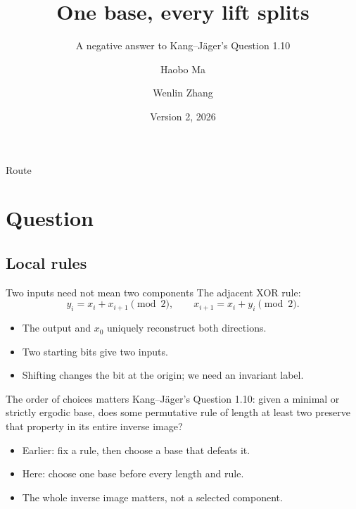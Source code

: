 \documentclass{beamer}
\title{One base, every lift splits}
\subtitle{A negative answer to Kang--Jäger's Question 1.10}
\author{Haobo Ma\inst{1} \and Wenlin Zhang\inst{1,2}}
\institute{\inst{1}Chrono AI, Singapore\and\inst{2}National University of Singapore, Singapore}
\date{Version 2, 2026}
\begin{document}
\begin{frame}
\titlepage
{}
\end{frame}

\begin{frame}{Route}
\tableofcontents
{}
\end{frame}

\section{Question}
\subsection{Local rules}

\begin{frame}{Two inputs need not mean two components}
The adjacent XOR rule:
\[
y_i=x_i+x_{i+1}\pmod 2,\qquad x_{i+1}=x_i+y_i\pmod 2.
\]
\begin{itemize}
\item The output and $x_0$ uniquely reconstruct both directions.
\item Two starting bits give two inputs.
\item Shifting changes the bit at the origin; we need an invariant label.
\end{itemize}
\end{frame}

\begin{frame}{The order of choices matters}
Kang--Jäger's Question 1.10: given a minimal or strictly ergodic base, does some permutative rule of length at least two preserve that property in its entire inverse image?
\medskip
\begin{itemize}
\item Earlier: fix a rule, then choose a base that defeats it.
\item Here: choose one base before every length and rule.
\item The whole inverse image matters, not a selected component.
\end{itemize}
\end{frame}
\end{document}
